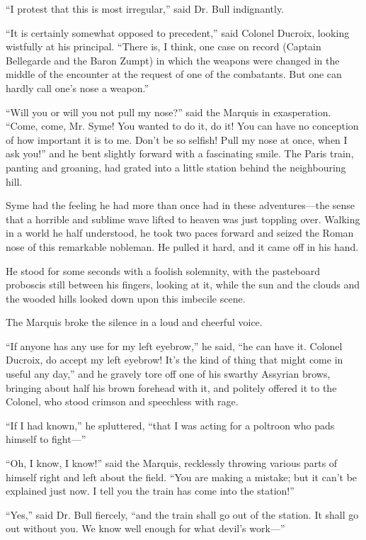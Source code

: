 “I protest that this is most irregular,” said Dr. Bull indignantly.

“It is certainly somewhat opposed to precedent,” said Colonel Ducroix, looking wistfully at his principal. “There is, I think, one case on record (Captain Bellegarde and the Baron Zumpt) in which the weapons were changed in the middle of the encounter at the request of one of the combatants. But one can hardly call one’s nose a weapon.”

“Will you or will you not pull my nose?” said the Marquis in exasperation. “Come, come, Mr. Syme! You wanted to do it, do it! You can have no conception of how important it is to me. Don’t be so selfish! Pull my nose at once, when I ask you!” and he bent slightly forward with a fascinating smile. The Paris train, panting and groaning, had grated into a little station behind the neighbouring hill.

Syme had the feeling he had more than once had in these adventures⁠—the sense that a horrible and sublime wave lifted to heaven was just toppling over. Walking in a world he half understood, he took two paces forward and seized the Roman nose of this remarkable nobleman. He pulled it hard, and it came off in his hand.

He stood for some seconds with a foolish solemnity, with the pasteboard proboscis still between his fingers, looking at it, while the sun and the clouds and the wooded hills looked down upon this imbecile scene.

The Marquis broke the silence in a loud and cheerful voice.

“If anyone has any use for my left eyebrow,” he said, “he can have it. Colonel Ducroix, do accept my left eyebrow! It’s the kind of thing that might come in useful any day,” and he gravely tore off one of his swarthy Assyrian brows, bringing about half his brown forehead with it, and politely offered it to the Colonel, who stood crimson and speechless with rage.

“If I had known,” he spluttered, “that I was acting for a poltroon who pads himself to fight⁠—”

“Oh, I know, I know!” said the Marquis, recklessly throwing various parts of himself right and left about the field. “You are making a mistake; but it can’t be explained just now. I tell you the train has come into the station!”

“Yes,” said Dr. Bull fiercely, “and the train shall go out of the station. It shall go out without you. We know well enough for what devil’s work⁠—”

